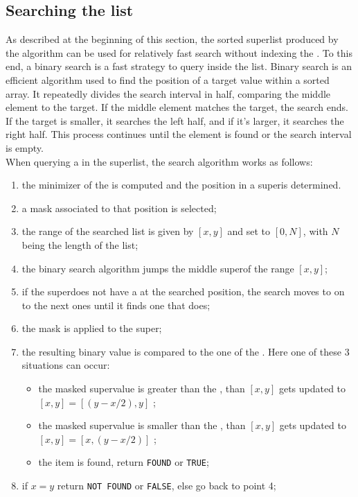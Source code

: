 \subsection{Searching the list}
As described at the beginning of this section, the sorted super\kmer list produced by the algorithm can be used for relatively fast search without indexing the \kmers. To this end, a binary search is a fast strategy to query \kmers inside the list. Binary search is an efficient algorithm used to find the position of a target value within a sorted array. It repeatedly divides the search interval in half, comparing the middle element to the target. If the middle element matches the target, the search ends. If the target is smaller, it searches the left half, and if it's larger, it searches the right half. This process continues until the element is found or the search interval is empty.\\
When querying a \kmer in the super\kmer list, the search algorithm works as follows:
\begin{enumerate}
	\item the minimizer of the \kmers is computed and the \kmer position in a super\kmer is determined.
	\item a mask associated to that position is selected;
	\item the range of the searched list is given by $[x,y]$ and set to $[0,N]$, with $N$ being the length of the list;
	\item the binary search algorithm jumps the middle super\kmer of the range $[x,y]$;
	\item if the super\kmer does not have a \kmer at the searched position, the search moves to on to the next ones until it finds one that does;
	\item the mask is applied to the super\kmer;
	\item the resulting binary value is compared to the one of the \kmer. Here one of these 3 situations can occur:
	\begin{itemize}
		\item the masked super\kmer value is greater than the \kmer, than $[x,y]$ gets updated to $[x,y] = [(y-x/2),y]$ ;
		\item the masked super\kmer value is smaller than the \kmer, than $[x,y]$ gets updated to $[x,y] = [x,(y-x/2)]$ ;
		\item the item is found, return \texttt{FOUND} or \texttt{TRUE};
	\end{itemize}
	\item if $x = y$ return \texttt{NOT FOUND} or \texttt{FALSE}, else go back to point 4;
\end{enumerate}
